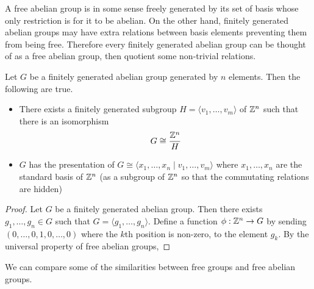 \documentclass[a4paper]{article}
\begin{document}
A free abelian group is in some sense freely generated by its set of basis whose only restriction is for it to be abelian. On the other hand, finitely generated abelian groups may have extra relations between basis elements preventing them from being free. Therefore every finitely generated abelian group can be thought of as a free abelian group, then quotient some non-trivial relations. 

\begin{prp}{}{} Let $G$ be a finitely generated abelian group generated by $n$ elements. Then the following are true. 
\begin{itemize}
\item There exists a finitely generated subgroup $H=\langle v_1,\dots,v_m\rangle$ of $\mathbb{Z}^n$ such that there is an isomorphism $$G\cong\frac{\mathbb{Z}^n}{H}$$
\item $G$ has the presentation of $G\cong\langle x_1,\dots,x_n\;|\;v_1,\dots,v_m\rangle$ where $x_1,\dots,x_n$ are the standard basis of $\mathbb{Z}^n$ (as a subgroup of $\mathbb{Z}^n$ so that the commutating relations are hidden)
\end{itemize} \tcbline
\begin{proof}
Let $G$ be a finitely generated abelian group. Then there exists $g_1,\dots,g_n\in G$ such that $G=\langle g_1,\dots,g_n\rangle$. Define a function $\phi:\mathbb{Z}^n\to G$ by sending $(0,\dots,0,1,0,\dots,0)$ where the $k$th position is non-zero, to the element $g_k$. By the universal property of free abelian groups, 
\end{proof}
\end{prp}

We can compare some of the similarities between free groups and free abelian groups. 
\end{document}
